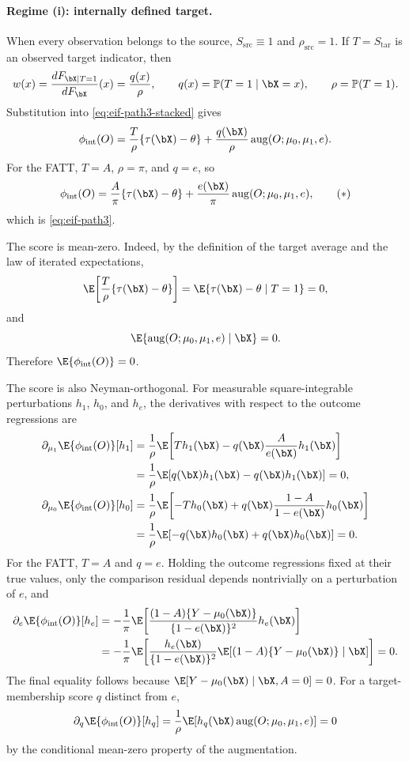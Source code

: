 \documentclass{article}
\renewcommand{\P}{\mathbb{P}}
\begin{document}
\paragraph{Regime (i): internally defined target.}
When every observation belongs to the source, $S_{\mathrm{src}}\equiv1$ and $\rho_{\mathrm{src}}=1$. If $T=S_{\mathrm{tar}}$ is an observed target indicator, then
\[
w(x)
=
\frac{dF_{\bX\mid T=1}}{dF_{\bX}}(x)
=
\frac{q(x)}{\rho},
\qquad
q(x)=\P(T=1\mid\bX=x),
\qquad
\rho=\P(T=1).
\]
Substitution into \eqref{eq:eif-path3-stacked} gives
\[
\phi_{\mathrm{int}}(O)
=
\frac{T}{\rho}\{\tau(\bX)-\theta\}
+
\frac{q(\bX)}{\rho}
\operatorname{aug}(O;\mu_0,\mu_1,e).
\]
For the FATT, $T=A$, $\rho=\pi$, and $q=e$, so
\[
\phi_{\mathrm{int}}(O)
=
\frac{A}{\pi}\{\tau(\bX)-\theta\}
+
\frac{e(\bX)}{\pi}
\operatorname{aug}(O;\mu_0,\mu_1,e),
\tag{$\ast$}
\]
which is \eqref{eq:eif-path3}.

The score is mean-zero. Indeed, by the definition of the target average and the law of iterated expectations,
\[
\E\!\left[
\frac{T}{\rho}\{\tau(\bX)-\theta\}
\right]
=
\E\{\tau(\bX)-\theta\mid T=1\}
=
0,
\]
and
\[
\E\{\operatorname{aug}(O;\mu_0,\mu_1,e)\mid\bX\}=0.
\]
Therefore $\E\{\phi_{\mathrm{int}}(O)\}=0$.

The score is also Neyman-orthogonal. For measurable square-integrable perturbations
$h_1$, $h_0$, and $h_e$, the derivatives with respect to the outcome regressions are
\begin{align*}
\partial_{\mu_1}
\E\{\phi_{\mathrm{int}}(O)\}[h_1]
&=
\frac{1}{\rho}
\E\!\left[
T h_1(\bX)
-
q(\bX)\frac{A}{e(\bX)}h_1(\bX)
\right]\\
&=
\frac{1}{\rho}
\E\!\left[
q(\bX)h_1(\bX)-q(\bX)h_1(\bX)
\right]
=0,
\\
\partial_{\mu_0}
\E\{\phi_{\mathrm{int}}(O)\}[h_0]
&=
\frac{1}{\rho}
\E\!\left[
-T h_0(\bX)
+
q(\bX)\frac{1-A}{1-e(\bX)}h_0(\bX)
\right]\\
&=
\frac{1}{\rho}
\E\!\left[
-q(\bX)h_0(\bX)+q(\bX)h_0(\bX)
\right]
=0.
\end{align*}
For the FATT, $T=A$ and $q=e$. Holding the outcome regressions fixed at their true values, only the comparison residual depends nontrivially on a perturbation of $e$, and
\begin{align*}
\partial_e
\E\{\phi_{\mathrm{int}}(O)\}[h_e]
&=
-\frac{1}{\pi}
\E\!\left[
\frac{(1-A)\{Y-\mu_0(\bX)\}}
     {\{1-e(\bX)\}^2}
h_e(\bX)
\right]\\
&=
-\frac{1}{\pi}
\E\!\left[
\frac{h_e(\bX)}{\{1-e(\bX)\}^2}
\E[
(1-A)\{Y-\mu_0(\bX)\}\mid\bX
]
\right]
=0.
\end{align*}
The final equality follows because
$\E[Y-\mu_0(\bX)\mid\bX,A=0]=0$.
For a target-membership score $q$ distinct from $e$,
\[
\partial_q
\E\{\phi_{\mathrm{int}}(O)\}[h_q]
=
\frac{1}{\rho}
\E[
h_q(\bX)\operatorname{aug}(O;\mu_0,\mu_1,e)
]
=0
\]
by the conditional mean-zero property of the augmentation.
\end{document}
